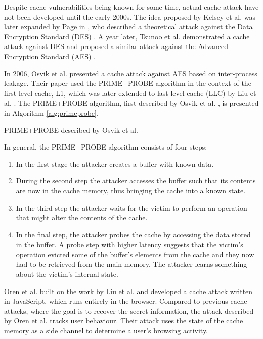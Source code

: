 \documentclass[10pt,a4paper,twoside]{book}
\begin{document}
Despite cache vulnerabilities being known for some time, actual cache attack have not been developed until the early 2000s. The idea proposed by Kelsey et al. \cite{kelsey1998side} was later expanded by Page in \cite{page2002theoretical}, who described a theoretical attack against the Data Encryption Standard (DES) \cite{standard1977federal}. A year later, Tsunoo et al. \cite{tsunoo2003cryptanalysis} demonstrated a cache attack against DES and proposed a similar attack against the Advanced Encryption Standard (AES) \cite{pub2001197} .

In 2006, Osvik et al.\cite{osvik2006cache} presented a cache attack against AES based on inter-process leakage. Their paper used the PRIME+PROBE algorithm in the context of the first level cache, L1, which was later extended to last level cache (LLC) by Liu et al. \cite{liu2015last}. The PRIME+PROBE algorithm, first described by Osvik et al. \cite{osvik2006cache}, is presented in Algorithm \ref{alg:primeprobe}.

\begin{algorithm}
\caption{PRIME+PROBE described by Osvik et al.\cite{osvik2006cache} }
\label{alg:primeprobe}
In general, the PRIME+PROBE algorithm consists of four steps:
\begin{enumerate}
\item In the first stage the attacker creates a buffer with known data.
\item During the second step the attacker accesses the buffer such that its contents are now in the cache memory, thus bringing the cache into a known state.
\item In the third step the attacker waits for the victim to perform an operation that might alter the contents of the cache.
\item In the final step, the attacker probes the cache by accessing the data stored in the buffer. A probe step with higher latency suggests that the victim's operation evicted some of the buffer's elements from the cache and they now had to be retrieved from the main memory. The attacker learns something about the victim's internal state.
\end{enumerate}
\end{algorithm}

Oren et al.\cite{oren2015spy} built on the work by Liu et al. \cite{liu2015last} and developed a cache attack written in JavaScript, which runs entirely in the browser. Compared to previous cache attacks, where the goal is to recover the secret information, the attack described by Oren et al. \cite{oren2015spy} tracks user behaviour. Their attack uses the state of the cache memory as a side channel to determine a user's browsing activity.
\end{document}
